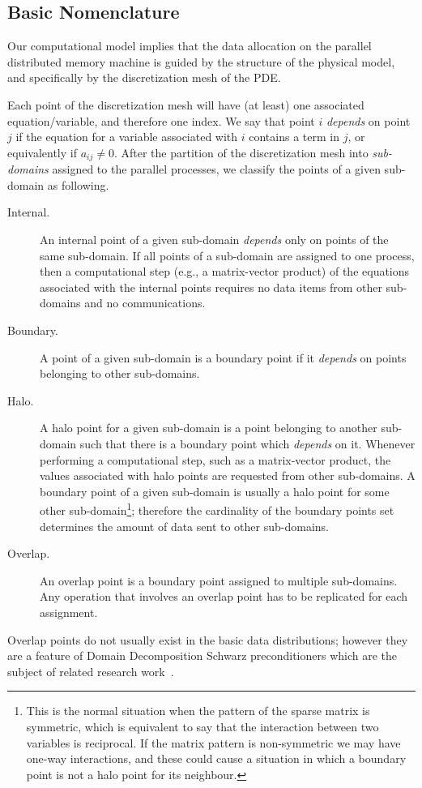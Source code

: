 \subsection{Basic Nomenclature}


Our computational model implies that the data allocation on the
parallel distributed memory machine is guided by the structure of the
physical model, and specifically by the discretization mesh of the
PDE. 

Each point of the discretization mesh will have (at least) one
associated equation/variable, and therefore one index. We say that
point  $i$ {\em depends\/} on point $j$ if the  equation for a
variable associated with $i$ contains a term in $j$,  or equivalently
if $a_{ij} \ne0$.  
After the partition of the discretization mesh into {\em sub-domains\/}
assigned to the parallel processes,
we classify the  points of a given sub-domain as following.
\begin{description}
\item[Internal.] An internal point of
 a given sub-domain {\em depends} only on  points of the
same sub-domain. 
If all points of a sub-domain are assigned to one
process, then a computational step (e.g., a matrix-vector product) of
the  equations associated with the internal points  requires no data 
items from other sub-domains and no communications.

\item[Boundary.] A point of a given sub-domain is a boundary point if
  it {\em depends} on  points belonging to other sub-domains.

\item[Halo.] A halo point for a given sub-domain is a point belonging to
another sub-domain such that there is a boundary point which {\em depends\/}
on it. Whenever performing a computational step, such as a
matrix-vector product, the values associated with halo points are
requested from other sub-domains. A boundary point of a given 
sub-domain is usually a halo point for some other sub-domain\footnote{This is
  the normal situation when the pattern of the sparse matrix is
  symmetric, which is equivalent to say that the interaction between
  two variables is reciprocal. If the matrix pattern is non-symmetric
  we may have one-way interactions, and these could cause a situation
  in which a boundary point is not a halo point for its neighbour.}; therefore
the cardinality of the boundary points set determines the amount of data
 sent to other sub-domains. 
\item[Overlap.] An overlap point is a boundary point assigned to
multiple sub-domains. Any operation that involves an overlap point
has to be replicated for each assignment. 
\end{description}
Overlap points do not usually exist in the basic data
distributions; however they are a feature of Domain Decomposition
Schwarz preconditioners which are the subject of related research
work~\cite{2007c,2007d}.

